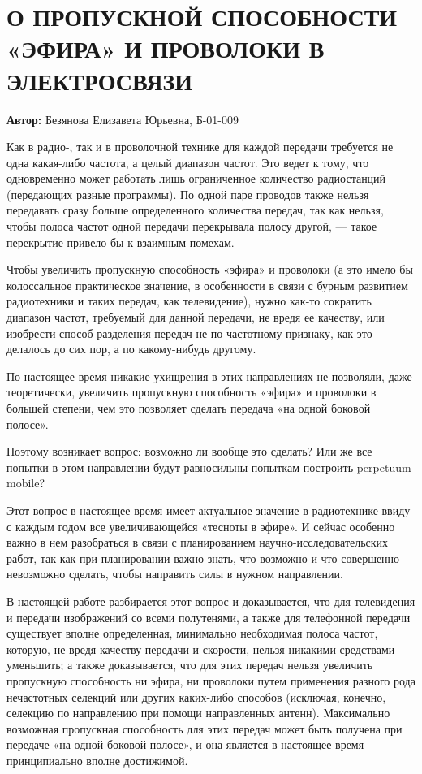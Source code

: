 
\section{О ПРОПУСКНОЙ СПОСОБНОСТИ «ЭФИРА» И ПРОВОЛОКИ В ЭЛЕКТРОСВЯЗИ}

\textbf{Автор:} Безянова Елизавета Юрьевна, Б-01-009

Как в радио-, так и в проволочной технике для каждой передачи требуется не одна какая-либо частота, а целый диапазон частот. Это ведет к тому, что одновременно может работать лишь ограниченное количество радиостанций (передающих разные программы). По одной паре проводов также нельзя передавать сразу больше определенного количества передач, так как нельзя, чтобы полоса частот одной передачи перекрывала полосу другой, --- такое перекрытие привело бы к взаимным помехам.

Чтобы увеличить пропускную способность «эфира» и проволоки (а это имело бы колоссальное практическое значение, в особенности в связи с бурным развитием радиотехники и таких передач, как телевидение), нужно как-то сократить диапазон частот, требуемый для данной передачи, не вредя ее качеству, или изобрести способ разделения передач не по частотному признаку, как это делалось до сих пор, а по какому-нибудь другому.

По настоящее время никакие ухищрения в этих направлениях не позволяли, даже теоретически, увеличить пропускную способность «эфира» и проволоки в большей степени, чем это позволяет сделать передача «на одной боковой полосе».

Поэтому возникает вопрос: возможно ли вообще это сделать? Или же все попытки в этом направлении будут равносильны попыткам построить perpetuum mobile?

Этот вопрос в настоящее время имеет актуальное значение в радиотехнике ввиду с каждым годом все увеличивающейся «тесноты в эфире». И сейчас особенно важно в нем разобраться в связи с планированием научно-исследовательских работ, так как при планировании важно знать, что возможно и что совершенно невозможно сделать, чтобы направить силы в нужном направлении.

В настоящей работе разбирается этот вопрос и доказывается, что для телевидения и передачи изображений со всеми полутенями, а также для телефонной передачи существует вполне определенная, минимально необходимая полоса частот, которую, не вредя качеству передачи и скорости, нельзя никакими средствами уменьшить; а также доказывается, что для этих передач нельзя увеличить пропускную способность ни эфира, ни проволоки путем применения разного рода нечастотных селекций или других каких-либо способов (исключая, конечно, селекцию по направлению при помощи направленных антенн). Максимально возможная пропускная способность для этих передач может быть получена при передаче «на одной боковой полосе», и она является в настоящее время принципиально вполне достижимой.

